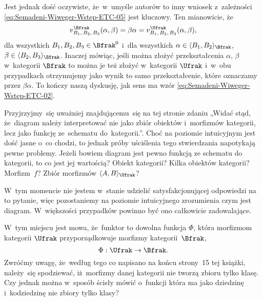 Jest jednak dość oczywiste, że~w~umyśle autorów to inny wniosek z~zależności
\eqref{eq:Semadeni-Wiweger-Wstep-ETC-05} jest kluczowy. Ten mianowicie, że
\begin{equation}
  \label{eq:Semadeni-Wiweger-Wstep-ETC-07}
  v_{ B_{ 1 }, \, B_{ 2 }, \, B_{ 3 } }^{ \Bfrak }( \alpha, \beta ) =
  \beta \alpha =
  v_{ B_{ 1 }, \, B_{ 2 }, \, B_{ 3 } }^{ \Ufrak }( \alpha, \beta ),
\end{equation}
dla wszystkich $B_{ 1 }, B_{ 2 }, B_{ 3 } \in \Bfrak^{ 0 }$ i~dla wszystkich
$\alpha \in \langle B_{ 1 }, B_{ 2 } \rangle_{ \Bfrak }$, $\beta \in \langle B_{ 2 }, B_{ 3 } \rangle_{ \Bfrak }$.
Inaczej mówiąc, jeśli można złożyć przekształcenia $\alpha$, $\beta$ w~kategorii
$\Bfrak$ to można je też złożyć w~kategorii $\Ufrak$ i~w~obu przypadkach
otrzymujemy jako wynik to samo przekształcenie, które oznaczamy przez
$\beta \alpha$. To kończy naszą dyskusję, jak sens ma wzór
\eqref{eq:Semadeni-Wiweger-Wstep-ETC-02}.

\vspace{\VerSpaceFour}





\noindent
{} Przyjrzyjmy~się uważniej znajdującemu~się na tej stronie zdaniu
„Widać stąd, że~diagram należy interpretować nie jako zbiór obiektów
i~morfizmów kategorii, lecz jako funkcję ze~schematu do~kategorii.”. Choć na
poziomie intuicyjnym jest dość jasne o~co chodzi, to jednak próby uściślenia
tego stwierdzania napotykają pewne problemy. Jeżeli bowiem diagram jest
pewno funkcją ze schematu do kategorii, to co jest jej wartością? Obiekt
kategorii? Kilka obiektów kategorii? Morfizm~$f$? Zbiór morfizmów
$\langle A, B \rangle_{ \Ufrak }$?

W~tym momencie nie jestem w~stanie udzielić satysfakcjonującej odpowiedzi na
to pytanie, więc pozostaniemy na poziomie intuicyjnego zrozumienia czym jest
diagram. W~większości przypadków powinno być ono całkowicie zadowalające.

\vspace{\VerSpaceFour}





\noindent
{} W~tym miejscu jest mowa, że~funktor to dowolna funkcja $\Phi$, która
morfizmom kategorii $\Ufrak$ przyporządkowuje morfizmy kategorii~$\Bfrak$,
\begin{equation}
  \label{eq:Semadeni-Wiweger-Wstep-ETC-08}
  \Phi : \Ufrak \to \Bfrak.
\end{equation}
Zwróćmy uwagę, że~według tego co napisano na końcu strony~15 tej książki,
należy~się spodziewać, iż~morfizmy danej kategorii nie tworzą zbioru tylko
klasę. Czy jednak można w~sposób ścisły mówić o~funkcji która ma jako
dziedzinę i~kodziedzinę nie zbiory tylko klasy?

